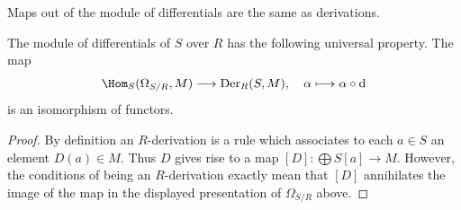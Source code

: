 \begin{lemma}
\label{lemma-universal-omega}
\begin{slogan}
Maps out of the module of differentials are the same as derivations.
\end{slogan}
The module of differentials of $S$ over $R$ has the following
universal property. The map
$$
\Hom_S(\Omega_{S/R}, M)
\longrightarrow
\text{Der}_R(S, M), \quad
\alpha
\longmapsto
\alpha \circ \text{d}
$$
is an isomorphism of functors.
\end{lemma}

\begin{proof}
By definition an $R$-derivation is a rule which associates
to each $a \in S$ an element $D(a) \in M$. Thus $D$ gives
rise to a map $[D] : \bigoplus S[a] \to M$. However, the conditions
of being an $R$-derivation exactly mean that $[D]$ annihilates
the image of the map in the displayed presentation of
$\Omega_{S/R}$ above.
\end{proof}
